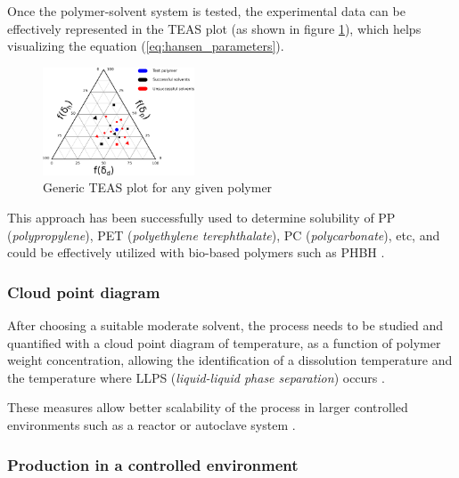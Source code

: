 \documentclass{article}
\begin{document}
    Once the polymer-solvent system is tested, the experimental data can be effectively represented in the TEAS plot (as shown in figure \ref{fig:TEAS_plot}), which 
    helps visualizing the equation (\ref{eq:hansen_parameters}). 

    \begin{figure}[h!]
        \centering
        \includegraphics[width=0.4\textwidth]{Pictures/TEAS_plot.eps}
        \caption{Generic TEAS plot for any given polymer \autocites{DechetMaximilianA2020OtDo}{Inkscape}}
        \label{fig:TEAS_plot}
    \end{figure}


    This approach has been successfully used to determine solubility of PP (\textit{polypropylene}), PET (\textit{polyethylene terephthalate}), 
    PC (\textit{polycarbonate}), etc, and could be effectively utilized with bio-based polymers such as PHBH \autocites{DechetMaximilianA2020OtDo}.
    
    

    \subsubsection{Cloud point diagram \label{Cloud_point_diagram}}

    After choosing a suitable moderate solvent, the process needs to be studied and quantified 
    with a cloud point diagram of temperature, as a function of polymer weight concentration, allowing the identification of a dissolution 
    temperature and the temperature where LLPS (\textit{liquid-liquid phase separation}) occurs \autocites{DechetMaximilianA2020OtDo}. 
    
    These measures allow better scalability of the process in larger controlled environments such as a reactor or autoclave system \autocite{DechetMaximilianA2020OtDo}.
    
    \subsubsection{Production in a controlled environment \label{precipitation_production_controlled_environment}}
\end{document}
